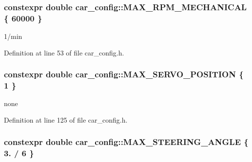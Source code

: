 \subsubsection[{\texorpdfstring{M\+A\+X\+\_\+\+R\+P\+M\+\_\+\+M\+E\+C\+H\+A\+N\+I\+C\+AL}{MAX_RPM_MECHANICAL}}]{\setlength{\rightskip}{0pt plus 5cm}constexpr double car\+\_\+config\+::\+M\+A\+X\+\_\+\+R\+P\+M\+\_\+\+M\+E\+C\+H\+A\+N\+I\+C\+AL \{ 60000 \}}\hypertarget{namespacecar__config_ad35069a183782259c6280aa219b72ffa}{}\label{namespacecar__config_ad35069a183782259c6280aa219b72ffa}


1/min 



Definition at line 53 of file car\+\_\+config.\+h.

\subsubsection[{\texorpdfstring{M\+A\+X\+\_\+\+S\+E\+R\+V\+O\+\_\+\+P\+O\+S\+I\+T\+I\+ON}{MAX_SERVO_POSITION}}]{\setlength{\rightskip}{0pt plus 5cm}constexpr double car\+\_\+config\+::\+M\+A\+X\+\_\+\+S\+E\+R\+V\+O\+\_\+\+P\+O\+S\+I\+T\+I\+ON \{ 1 \}}\hypertarget{namespacecar__config_af1712762f3ad9f8805ba474d5f3e7274}{}\label{namespacecar__config_af1712762f3ad9f8805ba474d5f3e7274}


none 



Definition at line 125 of file car\+\_\+config.\+h.

\subsubsection[{\texorpdfstring{M\+A\+X\+\_\+\+S\+T\+E\+E\+R\+I\+N\+G\+\_\+\+A\+N\+G\+LE}{MAX_STEERING_ANGLE}}]{\setlength{\rightskip}{0pt plus 5cm}constexpr double car\+\_\+config\+::\+M\+A\+X\+\_\+\+S\+T\+E\+E\+R\+I\+N\+G\+\_\+\+A\+N\+G\+LE \{ 3. / 6 \}}\hypertarget{namespacecar__config_a967b325af26effe80fbbc64dc68a36a0}{}\label{namespacecar__config_a967b325af26effe80fbbc64dc68a36a0}


